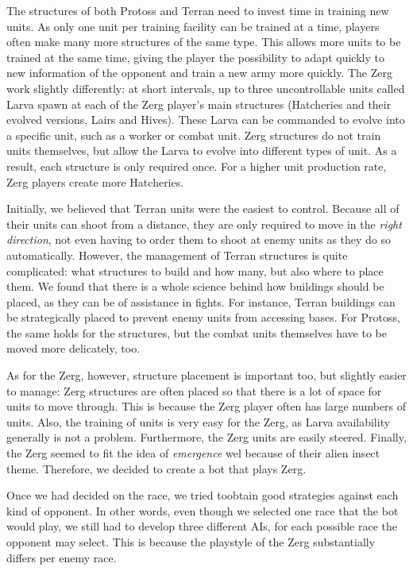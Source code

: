 The structures of both Protoss and Terran need to invest time in training new units. As only one unit per training facility can be trained at a time, players often make many more structures of the same type. This allows more units to be trained at the same time, giving the player the possibility to adapt quickly to new information of the opponent and train a new army more quickly. The Zerg work slightly differently: at short intervals, up to three uncontrollable units called Larva spawn at each of the Zerg player's main structures (Hatcheries and their evolved versions, Lairs and Hives). These Larva can be commanded to evolve into a specific unit, such as a worker or combat unit. Zerg structures do not train units themselves, but allow the Larva to evolve into different types of unit. As a result, each structure is only required once. For a higher unit production rate, Zerg players create more Hatcheries.

Initially, we believed that Terran units were the easiest to control. Because all of their units can shoot from a distance, they are only required to move in the \emph{right direction}, not even having to order them to shoot at enemy units as they do so automatically. However, the management of Terran structures is quite complicated: what structures to build and how many, but also where to place them. We found that there is a whole science behind how buildings should be placed, as they can be of assistance in fights. For instance, Terran buildings can be strategically placed to prevent enemy units from accessing bases. For Protoss, the same holds for the structures, but the combat units themselves have to be moved more delicately, too. 

As for the Zerg, however, structure placement is important too, but slightly easier to manage: Zerg structures are often placed so that there is a lot of space for units to move through. This is because the Zerg player often has large numbers of units. Also, the training of units is very easy for the Zerg, as Larva availability generally is not a problem. Furthermore, the Zerg units are easily steered. Finally, the Zerg seemed to fit the idea of \emph{emergence} wel because of their alien insect theme. Therefore, we decided to create a bot that plays Zerg.

Once we had decided on the race, we tried toobtain good strategies against each kind of opponent. In other words, even though we selected one race that the bot would play, we still had to develop three different AIs, for each possible race the opponent may select. This is because the playstyle of the Zerg substantially differs per enemy race.

